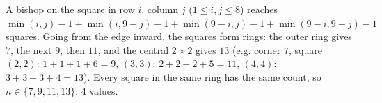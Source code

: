 A bishop on the square in row $i$, column $j$ ($1\le i,j\le8$) reaches $\min(i,j)-1+\min(i,9-j)-1+\min(9-i,j)-1+\min(9-i,9-j)-1$ squares. Going from the edge inward, the squares form rings: the outer ring gives $7$, the next $9$, then $11$, and the central $2\times2$ gives $13$ (e.g. corner $7$, square $(2,2)$: $1+1+1+6=9$, $(3,3)$: $2+2+2+5=11$, $(4,4)$: $3+3+3+4=13$). Every square in the same ring has the same count, so $n\in\{7,9,11,13\}$: $\boxed{4}$ values.
